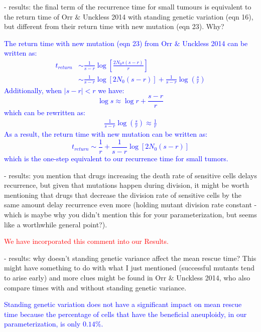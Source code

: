 \documentclass[12pt]{extarticle}
\begin{document}
- results: the final term of the recurrence time for small tumours is equivalent to the return time of Orr $\&$ Unckless 2014 with standing genetic variation (eqn 16), but different from their return time with new mutation (eqn 23). Why?

\textcolor{blue}{The return time with new mutation (eqn 23) from Orr $\&$ Unckless 2014 can be written as:
\begin{align*}
t_{return}&\sim\frac{1}{s-r}\log\left[\frac{2N_0s(s-r)}{r}\right]\\
&\sim \frac{1}{s-r}\log[2N_0(s-r)]+\frac{1}{s-r}\log\left(\frac{s}{r}\right)
\end{align*}
Additionally, when $|s-r|<r$ we have:
\begin{equation*}
\log s \approx \log r +\frac{s-r}{r}
\end{equation*}
which can be rewritten as:
\begin{align*}
\frac{1}{s-r}\log\left(\frac{s}{r}\right)\approx \frac{1}{r}
\end{align*}
As a result, the return time with new mutation can be written as:
\begin{equation*}
t_{return}\sim \frac{1}{r}+\frac{1}{s-r}\log[2N_0(s-r)]
\end{equation*}
which is the one-step equivalent to our recurrence time for small tumors.
} 

- results: you mention that drugs increasing the death rate of sensitive cells delays recurrence, but given that mutations happen during division, it might be worth mentioning that drugs that decrease the division rate of sensitive cells by the same amount delay recurrence even more (holding mutant division rate constant - which is maybe why you didn't mention this for your parameterization, but seems like a worthwhile general point?).

\textcolor{red}{%
We have incorporated this comment into our Results. %
}

- results: why doesn't standing genetic variance affect the mean rescue time? This might have something to do with what I just mentioned (successful mutants tend to arise early) and more clues might be found in Orr $\&$ Unckless 2014, who also compare times with and without standing genetic variance.

\textcolor{blue}{Standing genetic variation does not have a significant impact on mean rescue time because the percentage of cells that have the beneficial aneuploidy, in our parameterization, is only $0.14\%$.} 
\end{document}
